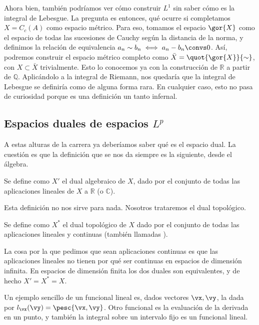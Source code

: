 \documentclass[palatino]{apuntes}
\begin{document}
Ahora bien, también podríamos ver cómo construir $L^1$ sin saber cómo es la integral de Lebesgue. La pregunta es entonces, qué ocurre si completamos $X = C_c(A)$ como espacio métrico. Para eso, tomamos el espacio $\gor{X}$ como el espacio de todas las sucesiones de Cauchy según la distancia de la norma, y definimos la relación de equivalencia $a_n \sim b_n \iff a_n - b_n \convs 0$. Así, podremos construir el espacio métrico completo como $\bar{X} = \quot{\gor{X}}{\sim}$, con $X ⊂ \bar{X}$ trivialmente. Esto lo conocemos ya con la construcción de $ℝ$ a partir de $ℚ$. Aplicándolo a la integral de Riemann, nos quedaría que la integral de Lebesgue se definiría como de alguna forma rara. En cualquier caso, esto no pasa de curiosidad porque es una definición un tanto infernal.

\subsection{Espacios duales de espacios $L^p$}

A estas alturas de la carrera ya deberíamos saber qué es el espacio dual. La cuestión es que la definición que se nos da siempre es la siguiente, desde el álgebra.

\begin{defn} Se define como $X'$ el dual algebraico de $X$, dado por el conjunto de todas las aplicaciones lineales de $X$ a $ℝ$ (o $ℂ$).
\end{defn}

Esta definición no nos sirve para nada. Nosotros trataremos el dual topológico.

\begin{defn} Se define como $X^\ast$ el dual topológico de $X$ dado por el conjunto de todas las aplicaciones lineales y continuas (también llamadas ). \end{defn}

La cosa por la que pedimos que sean aplicaciones continuas es que las aplicaciones lineales no tienen por qué ser continuas en espacios de dimensión infinita. En espacios de dimensión finita los dos duales son equivalentes, y de hecho $X' = X^\ast = X$.

Un ejemplo sencillo de un funcional lineal es, dados vectores $\vx, \vy$, la dada por $l_\vx(\vy) = \pesc{\vx, \vy}$. Otro funcional es la evaluación de la derivada en un punto, y también la integral sobre un intervalo fijo es un funcional lineal.
\end{document}
